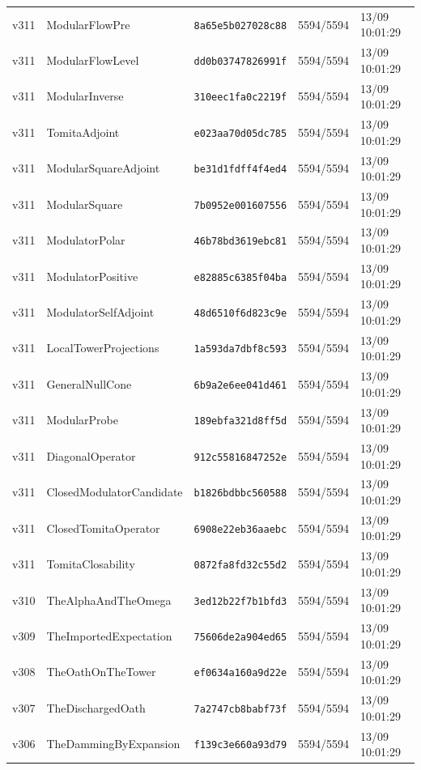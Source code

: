 \documentclass[11pt]{article}
\theoremstyle{definition}\newtheorem{deriv}{Derivação}
\begin{document}
{\begin{longtable}{@{}lllll@{}}
v311 & ModularFlowPre & \texttt{8a65e5b027028c88} & 5594/5594 & 13/09 10:01:29 \\
v311 & ModularFlowLevel & \texttt{dd0b03747826991f} & 5594/5594 & 13/09 10:01:29 \\
v311 & ModularInverse & \texttt{310eec1fa0c2219f} & 5594/5594 & 13/09 10:01:29 \\
v311 & TomitaAdjoint & \texttt{e023aa70d05dc785} & 5594/5594 & 13/09 10:01:29 \\
v311 & ModularSquareAdjoint & \texttt{be31d1fdff4f4ed4} & 5594/5594 & 13/09 10:01:29 \\
v311 & ModularSquare & \texttt{7b0952e001607556} & 5594/5594 & 13/09 10:01:29 \\
v311 & ModulatorPolar & \texttt{46b78bd3619ebc81} & 5594/5594 & 13/09 10:01:29 \\
v311 & ModulatorPositive & \texttt{e82885c6385f04ba} & 5594/5594 & 13/09 10:01:29 \\
v311 & ModulatorSelfAdjoint & \texttt{48d6510f6d823c9e} & 5594/5594 & 13/09 10:01:29 \\
v311 & LocalTowerProjections & \texttt{1a593da7dbf8c593} & 5594/5594 & 13/09 10:01:29 \\
v311 & GeneralNullCone & \texttt{6b9a2e6ee041d461} & 5594/5594 & 13/09 10:01:29 \\
v311 & ModularProbe & \texttt{189ebfa321d8ff5d} & 5594/5594 & 13/09 10:01:29 \\
v311 & DiagonalOperator & \texttt{912c55816847252e} & 5594/5594 & 13/09 10:01:29 \\
v311 & ClosedModulatorCandidate & \texttt{b1826bdbbc560588} & 5594/5594 & 13/09 10:01:29 \\
v311 & ClosedTomitaOperator & \texttt{6908e22eb36aaebc} & 5594/5594 & 13/09 10:01:29 \\
v311 & TomitaClosability & \texttt{0872fa8fd32c55d2} & 5594/5594 & 13/09 10:01:29 \\
v310 & TheAlphaAndTheOmega & \texttt{3ed12b22f7b1bfd3} & 5594/5594 & 13/09 10:01:29 \\
v309 & TheImportedExpectation & \texttt{75606de2a904ed65} & 5594/5594 & 13/09 10:01:29 \\
v308 & TheOathOnTheTower & \texttt{ef0634a160a9d22e} & 5594/5594 & 13/09 10:01:29 \\
v307 & TheDischargedOath & \texttt{7a2747cb8babf73f} & 5594/5594 & 13/09 10:01:29 \\
v306 & TheDammingByExpansion & \texttt{f139c3e660a93d79} & 5594/5594 & 13/09 10:01:29 \\

\end{longtable}}
\end{document}
